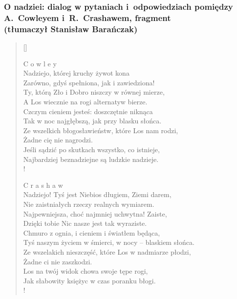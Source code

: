 \documentclass[10pt]{beamer}  %
\begin{document}
\begin{frame}
  \frametitle{O nadziei: dialog w pytaniach i~odpowiedziach pomiędzy \\
    A.~Cowleyem i~R.~Crashawem, fragment \\
    (tłumaczył Stanisław
    Barańczak)}

  \settowidth{\versewidth}{Zarówno, gdyś spełniona, jak i
    zawiedziona!} { \tiny
    \begin{verse}[\versewidth]
      \setlength{\vrightskip}{-10em} 

      C o w l e y \\
      \vin Nadziejo, której kruchy żywot kona \\
      Zarówno, gdyś spełniona, jak i zawiedziona! \\
      Ty, którą Zło i Dobro niszczy w równej mierze, \\
      A Los wiecznie na rogi alternatyw bierze. \\
      \vin Czczym cieniem jesteś: doszczętnie niknąca \\
      \vin Tak w noc najgłębszą, jak przy blasku słońca. \\
      \vin Ze wszelkich błogosławieństw, które Los nam rodzi, \\
      \vin\vin Żadne cię nie nagrodzi. \\
      Jeśli sądzić po skutkach wszystko, co istnieje, \\
      Najbardziej beznadziejne są ludzkie nadzieje. \\!

      C r a s h a w \\
      \vin Nadziejo! Tyś jest Niebios długiem, Ziemi darem, \\
      Nie zaistniałych rzeczy realnych wymiarem. \\
      Najpewniejsza, choć najmniej uchwytna! Zaiste, \\
      Dzięki tobie Nic nasze jest tak wyraziste. \\
      \vin Chmuro z ognia, i cieniem i światłem będąca, \\
      \vin Tyś naszym życiem w śmierci, w nocy -- blaskiem słońca. \\
      \vin Ze wszelakich nieszczęść, które Los w nadmiarze płodzi, \\
      \vin\vin Żadne ci nie zaszkodzi. \\
      Los na twój widok chowa swoje tępe rogi, \\
      Jak słabowity księżyc w czas poranku błogi. \\!

    \end{verse}
  }
\end{frame}
\end{document}
